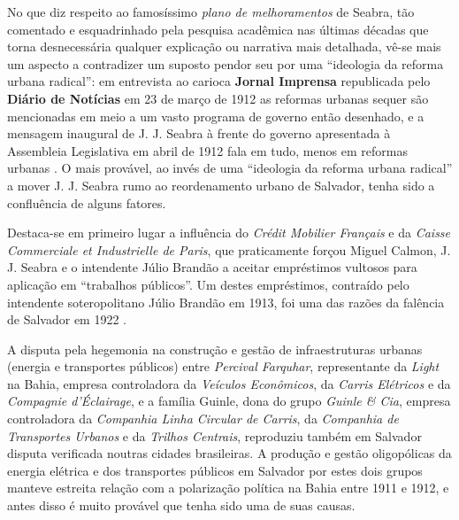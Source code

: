 No que diz respeito ao famosíssimo \textit{plano de melhoramentos} de Seabra, tão comentado e esquadrinhado pela pesquisa acadêmica nas últimas décadas que torna desnecessária qualquer explicação ou narrativa mais detalhada, vê-se mais um aspecto a contradizer um suposto pendor seu por uma ``ideologia da reforma urbana radical'': em entrevista ao carioca \textbf{Jornal Imprensa} republicada pelo \textbf{Diário de Notícias} em 23 de março de 1912 as reformas urbanas sequer são mencionadas em meio a um vasto programa de governo então desenhado, e a mensagem inaugural de J. J. Seabra à frente do governo apresentada à Assembleia Legislativa em abril de 1912 fala em tudo, menos em reformas urbanas \cite[pp.~92-94]{CUNHA2011}. O mais provável, ao invés de uma ``ideologia da reforma urbana radical'' a mover J. J. Seabra rumo ao reordenamento urbano de Salvador, tenha sido a confluência de alguns fatores.

Destaca-se em primeiro lugar a influência do \textit{Crédit Mobilier Français} e da \textit{Caisse Commerciale et Industrielle de Paris}, que praticamente forçou Miguel Calmon, J. J. Seabra e o intendente Júlio Brandão a aceitar empréstimos vultosos para aplicação em ``trabalhos públicos''. Um destes empréstimos, contraído pelo intendente soteropolitano Júlio Brandão em 1913, foi uma das razões da falência de Salvador em 1922 \cite[pp.~119-122,~291]{CUNHA2011}. 

A disputa pela hegemonia na construção e gestão de infraestruturas urbanas (energia e transportes públicos) entre \textit{Percival Farquhar}, representante da \textit{Light} na Bahia, empresa controladora da \textit{Veículos Econômicos}, da \textit{Carris Elétricos} e da \textit{Compagnie d'Éclairage}, e a família Guinle, dona do grupo \textit{Guinle \& Cia}, empresa controladora da \textit{Companhia Linha Circular de Carris}, da \textit{Companhia de Transportes Urbanos} e da \textit{Trilhos Centrais}, reproduziu também em Salvador disputa verificada noutras cidades brasileiras. A produção e gestão oligopólicas da energia elétrica e dos transportes públicos em Salvador por estes dois grupos manteve estreita relação com a polarização política na Bahia entre 1911 e 1912, e antes disso é muito provável que tenha sido uma de suas causas.

